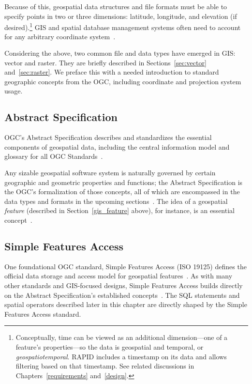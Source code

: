 Because of this, geospatial data structures and file formats must be able to specify points in two or three dimensions: latitude, longitude, and elevation (if desired).\footnote{Conceptually, time can be viewed as an additional dimension---one of a feature's properties---so the data is geospatial and temporal, or \textit{geospatiotemporal}. RAPID includes a timestamp on its data and allows filtering based on that timestamp. See related discussions in Chapters~\ref{requirements} and~\ref{design}.} GIS and spatial database management systems often need to account for any arbitrary coordinate system~\cite{gentle_intro}.

Considering the above, two common file and data types have emerged in GIS: vector and raster. They are briefly described in Sections~\ref{sec:vector} and~\ref{sec:raster}. We preface this with a needed introduction to standard geographic concepts from the OGC, including coordinate and projection system usage.

\subsection{Abstract Specification}
OGC's Abstract Specification describes and standardizes the essential components of geospatial data, including the central information model and glossary for all OGC Standards~\cite{AbstractSpecFaq}.

Any sizable geospatial software system is naturally governed by certain geographic and geometric properties and functions; the Abstract Specification is the OGC's formalization of those concepts, all of which are encompassed in the data types and formats in the upcoming sections~\cite{AbstractSpecFaq}. The idea of a geospatial \textit{feature} (described in Section~\ref{gis_feature} above), for instance, is an essential concept~\cite{Kottman2009,AbstractSpecFaq}.

\subsection{Simple Features Access}
One foundational OGC standard, Simple Features Access (ISO 19125) defines the official data storage and access model for geospatial features~\cite{SFA}. As with many other standards and GIS-focused designs, Simple Features Access builds directly on the Abstract Specification's established concepts~\cite{SFA,AbstractSpecFaq}. The SQL statements and spatial operators described later in this chapter are directly shaped by the Simple Features Access standard.

